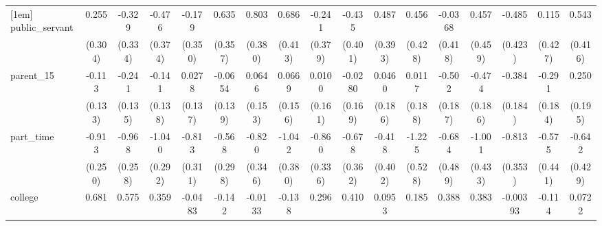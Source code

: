 {\begin{tabular}{l*{16}{c}}
[1em]
public\_servant      &       0.255         &      -0.329         &      -0.476         &      -0.179         &       0.635         &       0.803\sym{*}  &       0.686         &      -0.241         &      -0.435         &       0.487         &       0.456         &     -0.0368         &       0.457         &      -0.485         &       0.115         &       0.543         \\
                    &     (0.304)         &     (0.334)         &     (0.374)         &     (0.350)         &     (0.357)         &     (0.380)         &     (0.413)         &     (0.379)         &     (0.401)         &     (0.393)         &     (0.428)         &     (0.418)         &     (0.459)         &     (0.423)         &     (0.427)         &     (0.416)         \\
[1em]
parent\_15           &      -0.113         &      -0.241         &      -0.141         &      0.0278         &     -0.0654         &      0.0646         &      0.0669         &      0.0100         &     -0.0280         &      0.0460         &      0.0117         &      -0.502\sym{**} &      -0.474\sym{*}  &      -0.384\sym{*}  &      -0.291         &       0.250         \\
                    &     (0.133)         &     (0.135)         &     (0.138)         &     (0.137)         &     (0.139)         &     (0.153)         &     (0.156)         &     (0.161)         &     (0.169)         &     (0.186)         &     (0.188)         &     (0.187)         &     (0.186)         &     (0.184)         &     (0.184)         &     (0.195)         \\
[1em]
part\_time           &      -0.913\sym{***}&      -0.968\sym{***}&      -1.040\sym{***}&      -0.813\sym{**} &      -0.568         &      -0.820\sym{*}  &      -1.042\sym{**} &      -0.860\sym{*}  &      -0.678         &      -0.418         &      -1.225\sym{*}  &      -0.684         &      -1.001\sym{*}  &      -0.813\sym{*}  &      -0.575         &      -0.642         \\
                    &     (0.250)         &     (0.258)         &     (0.292)         &     (0.311)         &     (0.298)         &     (0.346)         &     (0.380)         &     (0.336)         &     (0.362)         &     (0.402)         &     (0.528)         &     (0.489)         &     (0.433)         &     (0.353)         &     (0.441)         &     (0.429)         \\
[1em]
college             &       0.681\sym{***}&       0.575\sym{**} &       0.359         &     -0.0483         &      -0.142         &     -0.0133         &      -0.138         &       0.296         &       0.410         &      0.0953         &       0.185         &       0.388         &       0.383         &    -0.00393         &      -0.114         &      0.0722         \\

\end{tabular}}
